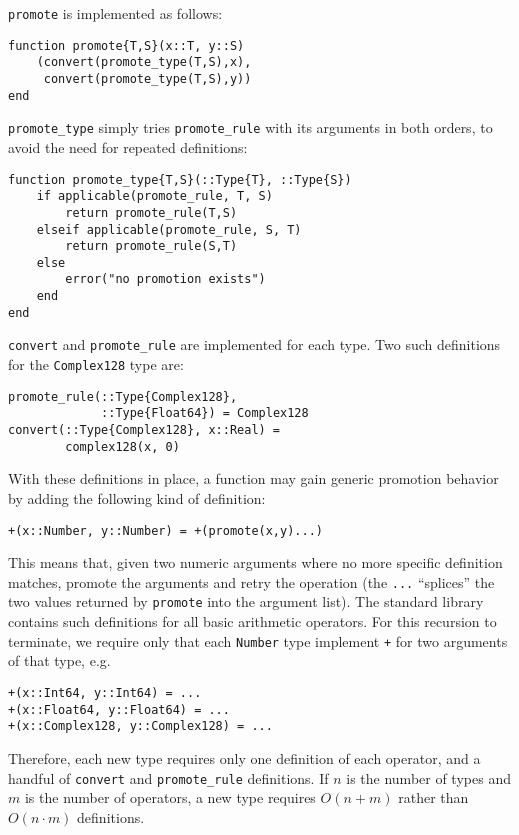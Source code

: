 \documentclass[9pt]{sigplanconf}
\begin{document}
{\tt promote} is implemented as follows:

\begin{verbatim}
function promote{T,S}(x::T, y::S)
    (convert(promote_type(T,S),x), 
     convert(promote_type(T,S),y))
end
\end{verbatim}

{\tt promote\_type} simply tries {\tt promote\_rule} with its arguments in
both orders, to avoid the need for repeated definitions:

\begin{verbatim}
function promote_type{T,S}(::Type{T}, ::Type{S})
    if applicable(promote_rule, T, S)
        return promote_rule(T,S)
    elseif applicable(promote_rule, S, T)
        return promote_rule(S,T)
    else
        error("no promotion exists")
    end
end
\end{verbatim}

{\tt convert} and {\tt promote\_rule} are implemented for each type. Two
such definitions for the {\tt Complex128} type are:

\begin{verbatim}
promote_rule(::Type{Complex128}, 
             ::Type{Float64}) = Complex128
convert(::Type{Complex128}, x::Real) = 
        complex128(x, 0)
\end{verbatim}

With these definitions in place, a function may gain generic promotion
behavior by adding the following kind of definition:

\begin{verbatim}
+(x::Number, y::Number) = +(promote(x,y)...)
\end{verbatim}

This means that, given two numeric arguments where no more specific
definition matches, promote the arguments and retry the operation
(the {\tt ...} ``splices'' the two values returned by {\tt promote} into
the argument list).
The standard library contains such definitions for all basic arithmetic
operators.
For this recursion to terminate, we require only that each {\tt Number}
type implement {\tt +} for two arguments of that type, e.g.

\begin{verbatim}
+(x::Int64, y::Int64) = ...
+(x::Float64, y::Float64) = ...
+(x::Complex128, y::Complex128) = ...
\end{verbatim}

Therefore, each new type requires only one definition of each operator,
and a handful of {\tt convert} and {\tt promote\_rule} definitions.
If $n$ is the number of types and $m$ is the number of operators, a new
type requires $O(n+m)$ rather than $O(n\cdot m)$ definitions.
\end{document}
